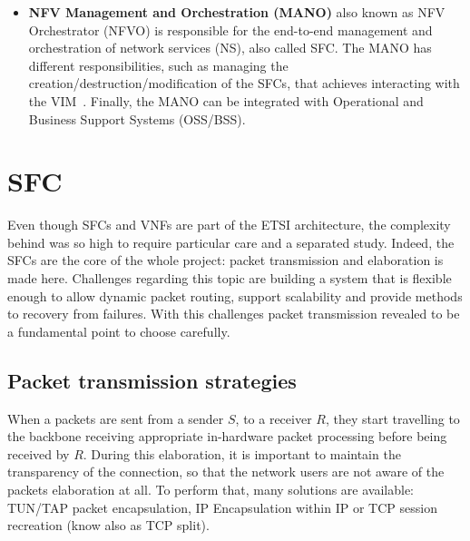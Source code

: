 \begin{itemize}
\item \textbf{NFV Management and Orchestration (MANO)} also known as NFV
  Orchestrator (NFVO) is responsible for the end-to-end management and
  orchestration of network services (NS), also called SFC. The MANO has
  different responsibilities, such as managing the
  creation/destruction/modification of the SFCs, that achieves interacting with
  the VIM~\cite{nguyen2017sdn}. Finally, the MANO can be integrated with
  Operational and Business Support Systems (OSS/BSS).
\end{itemize}


\section{SFC}
\label{chap:prjan:sfc}


Even though SFCs and VNFs are part of the ETSI architecture, the complexity 
behind was so high to require particular care and a separated study. Indeed, 
the  SFCs are the core of the whole project: packet transmission and 
elaboration is made here. Challenges regarding this topic are building a 
system that is flexible enough to allow dynamic packet routing, support 
scalability and provide methods to recovery from failures. With this challenges 
packet transmission revealed to be a fundamental point to choose carefully.

\subsection{Packet transmission strategies}

When a packets are sent from a sender $S$, to a receiver $R$, they start
travelling to the backbone receiving appropriate in-hardware packet processing
before being received by $R$. During this elaboration, it is important to
maintain the transparency of the connection, so that the network users are not
aware of the packets elaboration at all. To perform that, many solutions are
available: TUN/TAP packet encapsulation, IP Encapsulation within IP or TCP
session recreation (know also as TCP split).

